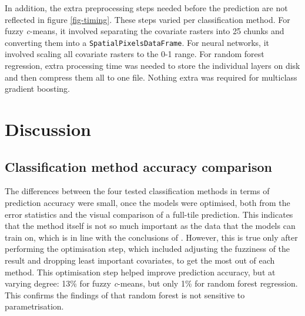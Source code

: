 \documentclass[a4paper,12pt]{scrbook}
\begin{document}
In addition, the extra preprocessing steps needed before the prediction are not reflected in figure \ref{fig-timing}. These steps varied per classification method. For fuzzy \textit{c}-means, it involved separating the covariate rasters into 25 chunks and converting them into a \texttt{SpatialPixelsDataFrame}. For neural networks, it involved scaling all covariate rasters to the 0-1 range. For random forest regression, extra processing time was needed to store the individual layers on disk and then compress them all to one file. Nothing extra was required for multiclass gradient boosting.

\chapter{Discussion}

\section{Classification method accuracy comparison}

The differences between the four tested classification methods in terms of prediction accuracy were small, once the models were optimised, both from the error statistics and the visual comparison of a full-tile prediction. This indicates that the method itself is not so much important as the data that the models can train on, which is in line with the conclusions of \citet{yu2014metadiscoveries}. However, this is true only after performing the optimisation step, which included adjusting the fuzziness of the result and dropping least important covariates, to get the most out of each method. This optimisation step helped improve prediction accuracy, but at varying degree: 13\% for fuzzy \textit{c}-means, but only 1\% for random forest regression. This confirms the findings of \citet{Pelletier2016hardrf} that random forest is not sensitive to parametrisation.
\end{document}

